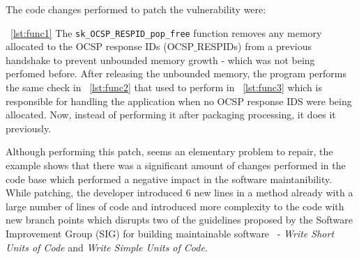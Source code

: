 \documentclass[10pt,conference]{IEEEtran}
\newcommand\Sof[1]{\nb{Sofia}{red}{#1}}
\begin{document}
The code changes performed to patch the vulnerability were:

~\ref{lst:func1} The \texttt{sk\_OCSP\_RESPID\_pop\_free} function removes any
memory allocated to the OCSP response IDs (OCSP$\_$RESPIDs) from a previous handshake to prevent unbounded memory growth - which was not being perfomed before.
After releasing the unbounded memory, the program performs the same check 
in ~\ref{lst:func2} that used to perform in ~\ref{lst:func3} which is responsible 
for handling the application when no OCSP response IDS were being allocated. Now, instead of performing it after packaging processing, it does it previously.

Although performing this patch, seems an elementary problem to repair,
the example shows that there was a significant amount of changes performed
in the code base which performed a negative impact in the software maintanibility.
While patching, the developer introduced $6$ new lines in a method already with 
a large number of lines of code and introduced more complexity to the code
with new branch points which disrupts two of the guidelines proposed by the Software Improvement Group (SIG) for
building maintainable software~\cite{Visser:2016:OREILLY} - \emph{Write Short Units of Code}
and \emph{Write Simple Units of Code}. 

\end{document}
